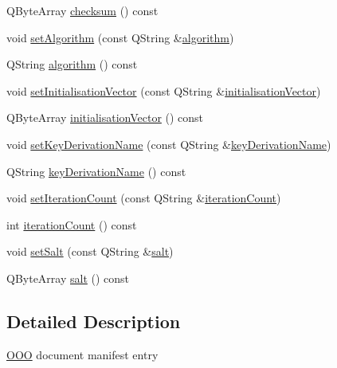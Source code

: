 \begin{DoxyCompactItemize}
Q\+Byte\+Array \hyperlink{classOOO_1_1ManifestEntry_a664851cf0939cdd4ffa5f1c79085d8e3}{checksum} () const 
\item 
void \hyperlink{classOOO_1_1ManifestEntry_a77d0d27a37517813700ee830f9c11c72}{set\+Algorithm} (const Q\+String \&\hyperlink{classOOO_1_1ManifestEntry_a1077f5bb046c6b561ab9f19b6bdf83c4}{algorithm})
\item 
Q\+String \hyperlink{classOOO_1_1ManifestEntry_a1077f5bb046c6b561ab9f19b6bdf83c4}{algorithm} () const 
\item 
void \hyperlink{classOOO_1_1ManifestEntry_a5a6783f55b0e2f5e9c41a77c518f9cb2}{set\+Initialisation\+Vector} (const Q\+String \&\hyperlink{classOOO_1_1ManifestEntry_a3222cd472a37cdb9b69ebc4aaa34c9a1}{initialisation\+Vector})
\item 
Q\+Byte\+Array \hyperlink{classOOO_1_1ManifestEntry_a3222cd472a37cdb9b69ebc4aaa34c9a1}{initialisation\+Vector} () const 
\item 
void \hyperlink{classOOO_1_1ManifestEntry_a6d1398f193f038fd3e605df33564154b}{set\+Key\+Derivation\+Name} (const Q\+String \&\hyperlink{classOOO_1_1ManifestEntry_aba1a83aefa6e73835117c93daf6d9955}{key\+Derivation\+Name})
\item 
Q\+String \hyperlink{classOOO_1_1ManifestEntry_aba1a83aefa6e73835117c93daf6d9955}{key\+Derivation\+Name} () const 
\item 
void \hyperlink{classOOO_1_1ManifestEntry_ab78f36fcf7d297649148a1e97f810328}{set\+Iteration\+Count} (const Q\+String \&\hyperlink{classOOO_1_1ManifestEntry_acc01f966a209860856a84ea83e9aff8c}{iteration\+Count})
\item 
int \hyperlink{classOOO_1_1ManifestEntry_acc01f966a209860856a84ea83e9aff8c}{iteration\+Count} () const 
\item 
void \hyperlink{classOOO_1_1ManifestEntry_a94422c9f4b80209ec1fdf876b0832c7d}{set\+Salt} (const Q\+String \&\hyperlink{classOOO_1_1ManifestEntry_ad4f788206aaeb89a2794a40d299ceaee}{salt})
\item 
Q\+Byte\+Array \hyperlink{classOOO_1_1ManifestEntry_ad4f788206aaeb89a2794a40d299ceaee}{salt} () const 
\end{DoxyCompactItemize}


\subsection{Detailed Description}
\hyperlink{namespaceOOO}{O\+O\+O} document manifest entry

